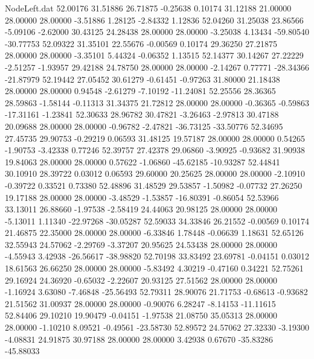 \begin{filecontents}{NodeLeft.dat}
  52.00176   31.51886   26.71875    -0.25638    0.10174   31.12188   21.00000   28.00000   28.00000   -3.51886    1.28125   -2.84332    1.12836
  52.04260   31.25038   23.86566    -5.09106   -2.62000   30.43125   24.28438   28.00000   28.00000   -3.25038    4.13434  -59.80540  -30.77753
  52.09322   31.35101   22.55676    -0.00569    0.10174   29.36250   27.21875   28.00000   28.00000   -3.35101    5.44324   -0.06352    1.13515
  52.14377   30.14267   27.22229    -2.51257   -1.93957   29.42188   24.78750   28.00000   28.00000   -2.14267    0.77771  -28.34366  -21.87979
  52.19442   27.05452   30.61279    -0.61451   -0.97263   31.80000   21.18438   28.00000   28.00000    0.94548   -2.61279   -7.10192  -11.24081
  52.25556   28.36365   28.59863    -1.58144   -0.11313   31.34375   21.72812   28.00000   28.00000   -0.36365   -0.59863  -17.31161   -1.23841
  52.30633   28.96782   30.47821    -3.26463   -2.97813   30.47188   20.09688   28.00000   28.00000   -0.96782   -2.47821  -36.73125  -33.50776
  52.34695   27.45735   29.90753    -0.29219    0.06593   31.48125   19.57187   28.00000   28.00000    0.54265   -1.90753   -3.42338    0.77246
  52.39757   27.42378   29.06860    -3.90925   -0.93682   31.90938   19.84063   28.00000   28.00000    0.57622   -1.06860  -45.62185  -10.93287
  52.44841   30.10910   28.39722     0.03012    0.06593   29.60000   20.25625   28.00000   28.00000   -2.10910   -0.39722    0.33521    0.73380
  52.48896   31.48529   29.53857    -1.50982   -0.07732   27.26250   19.17188   28.00000   28.00000   -3.48529   -1.53857  -16.80391   -0.86054
  52.53966   33.13011   26.88660    -1.97538   -2.58419   24.44063   20.98125   28.00000   28.00000   -5.13011    1.11340  -22.97268  -30.05287
  52.59033   34.33846   26.21552    -0.00569    0.10174   21.46875   22.35000   28.00000   28.00000   -6.33846    1.78448   -0.06639    1.18631
  52.65126   32.55943   24.57062    -2.29769   -3.37207   20.95625   24.53438   28.00000   28.00000   -4.55943    3.42938  -26.56617  -38.98820
  52.70198   33.83492   23.69781    -0.04151    0.03012   18.61563   26.66250   28.00000   28.00000   -5.83492    4.30219   -0.47160    0.34221
  52.75261   29.16924   24.36920    -0.65032   -2.22607   20.93125   27.51562   28.00000   28.00000   -1.16924    3.63080   -7.46848  -25.56493
  52.79311   28.90076   21.71753    -0.68613   -0.93682   21.51562   31.00937   28.00000   28.00000   -0.90076    6.28247   -8.14153  -11.11615
  52.84406   29.10210   19.90479    -0.04151   -1.97538   21.08750   35.05313   28.00000   28.00000   -1.10210    8.09521   -0.49561  -23.58730
  52.89572   24.57062   27.32330    -3.19300   -4.08831   24.91875   30.97188   28.00000   28.00000    3.42938    0.67670  -35.83286  -45.88033

\end{filecontents}
